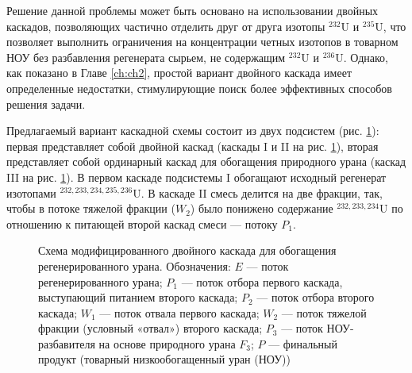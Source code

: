 Решение данной проблемы может быть основано на использовании двойных каскадов, позволяющих частично отделить друг от друга изотопы $^{232}$U и $^{235}$U, что позволяет выполнить ограничения на концентрации четных изотопов в товарном НОУ без разбавления регенерата сырьем, не содержащим $^{232}$U и $^{236}$U. Однако, как показано в Главе \ref{ch:ch2}, простой вариант двойного каскада имеет определенные недостатки, стимулирующие поиск более эффективных способов решения задачи. 

Предлагаемый вариант каскадной схемы состоит из двух подсистем (рис. \ref{p2left}): первая представляет собой двойной каскад (каскады I и II на рис. \ref{p2left}), вторая представляет собой ординарный каскад для обогащения природного урана (каскад III на рис. \ref{p2left}). В первом каскаде подсистемы I обогащают исходный регенерат изотопами $^{232,233,234,235,236}$U. В каскаде II смесь делится на две фракции, так, чтобы в потоке тяжелой фракции ($W_2$) было понижено содержание $^{232,233,234}$U по отношению к питающей второй каскад смеси --- потоку $P_1$. 

\begin{figure}[ht]
    \caption{Схема модифицированного двойного каскада для обогащения регенерированного урана. Обозначения: $E$ --- поток регенерированного урана; $P_1$ --- поток отбора первого каскада, выступающий питанием второго каскада; $P_2$ --- поток отбора второго каскада; $W_1$ --- поток отвала первого каскада; $W_2$ --- поток тяжелой фракции (условный «отвал») второго каскада; $P_3$ --- поток НОУ-разбавителя  на основе природного урана $F_3$; $P$ --- финальный продукт (товарный низкообогащенный уран (НОУ))}\label{p2left}
\end{figure}

\newpage

